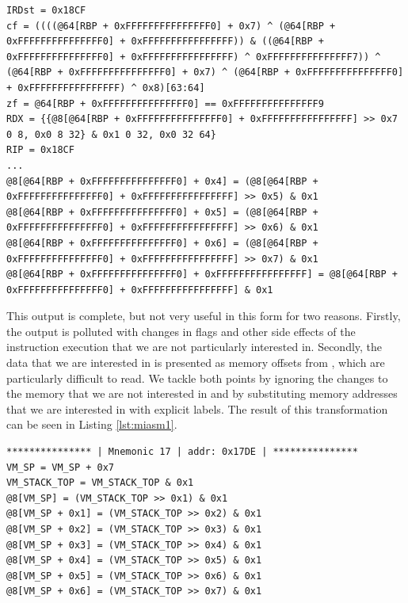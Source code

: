 \begin{lstlisting}[label={lst:miasm0}, caption={Partial result of symbolically executing a function handler in Miasm. We notice the state change in core registers such as \cc{RDX}, flag changes, as well as changes in memory.}]
IRDst = 0x18CF
cf = ((((@64[RBP + 0xFFFFFFFFFFFFFFF0] + 0x7) ^ (@64[RBP + 0xFFFFFFFFFFFFFFF0] + 0xFFFFFFFFFFFFFFFF)) & ((@64[RBP + 0xFFFFFFFFFFFFFFF0] + 0xFFFFFFFFFFFFFFFF) ^ 0xFFFFFFFFFFFFFFF7)) ^ (@64[RBP + 0xFFFFFFFFFFFFFFF0] + 0x7) ^ (@64[RBP + 0xFFFFFFFFFFFFFFF0] + 0xFFFFFFFFFFFFFFFF) ^ 0x8)[63:64]
zf = @64[RBP + 0xFFFFFFFFFFFFFFF0] == 0xFFFFFFFFFFFFFFF9
RDX = {{@8[@64[RBP + 0xFFFFFFFFFFFFFFF0] + 0xFFFFFFFFFFFFFFFF] >> 0x7 0 8, 0x0 8 32} & 0x1 0 32, 0x0 32 64}
RIP = 0x18CF
...
@8[@64[RBP + 0xFFFFFFFFFFFFFFF0] + 0x4] = (@8[@64[RBP + 0xFFFFFFFFFFFFFFF0] + 0xFFFFFFFFFFFFFFFF] >> 0x5) & 0x1
@8[@64[RBP + 0xFFFFFFFFFFFFFFF0] + 0x5] = (@8[@64[RBP + 0xFFFFFFFFFFFFFFF0] + 0xFFFFFFFFFFFFFFFF] >> 0x6) & 0x1
@8[@64[RBP + 0xFFFFFFFFFFFFFFF0] + 0x6] = (@8[@64[RBP + 0xFFFFFFFFFFFFFFF0] + 0xFFFFFFFFFFFFFFFF] >> 0x7) & 0x1
@8[@64[RBP + 0xFFFFFFFFFFFFFFF0] + 0xFFFFFFFFFFFFFFFF] = @8[@64[RBP + 0xFFFFFFFFFFFFFFF0] + 0xFFFFFFFFFFFFFFFF] & 0x1
\end{lstlisting}

This output is complete, but not very useful in this form for two reasons. Firstly, the output is polluted with changes in flags and other side effects of the instruction execution that we are not particularly interested in. Secondly, the data that we are interested in is presented as memory offsets from , which are particularly difficult to read. We tackle both points by ignoring the changes to the memory that we are not interested in and by substituting memory addresses that we are interested in with explicit labels. The result of this transformation can be seen in Listing \ref{lst:miasm1}.

\begin{lstlisting}[label={lst:miasm1}, caption={A cleaned-up result of symbolically executing the same function handler as in Listing \ref{lst:miasm0}. We only chose to display the change in relevant registers and memory locations. Additionally, we introduced labels for better clarity.}]
*************** | Mnemonic 17 | addr: 0x17DE | ***************
VM_SP = VM_SP + 0x7
VM_STACK_TOP = VM_STACK_TOP & 0x1
@8[VM_SP] = (VM_STACK_TOP >> 0x1) & 0x1
@8[VM_SP + 0x1] = (VM_STACK_TOP >> 0x2) & 0x1
@8[VM_SP + 0x2] = (VM_STACK_TOP >> 0x3) & 0x1
@8[VM_SP + 0x3] = (VM_STACK_TOP >> 0x4) & 0x1
@8[VM_SP + 0x4] = (VM_STACK_TOP >> 0x5) & 0x1
@8[VM_SP + 0x5] = (VM_STACK_TOP >> 0x6) & 0x1
@8[VM_SP + 0x6] = (VM_STACK_TOP >> 0x7) & 0x1
\end{lstlisting}

